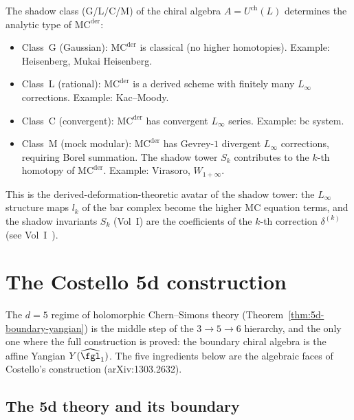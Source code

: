 \begin{remark}
\label{rem:shadow-class-mc}
The shadow class (G/L/C/M) of the chiral algebra $A = U^{\mathrm{ch}}(L)$ determines the analytic type of $\mathrm{MC}^{\mathrm{der}}$:
\begin{itemize}
 \item Class~G (Gaussian): $\mathrm{MC}^{\mathrm{der}}$ is classical (no higher homotopies). Example: Heisenberg, Mukai Heisenberg.
 \item Class~L (rational): $\mathrm{MC}^{\mathrm{der}}$ is a derived scheme with finitely many $L_\infty$ corrections. Example: Kac--Moody.
 \item Class~C (convergent): $\mathrm{MC}^{\mathrm{der}}$ has convergent $L_\infty$ series. Example: bc system.
 \item Class~M (mock modular): $\mathrm{MC}^{\mathrm{der}}$ has Gevrey-$1$ divergent $L_\infty$ corrections, requiring Borel summation. The shadow tower $S_k$ contributes to the $k$-th homotopy of $\mathrm{MC}^{\mathrm{der}}$. Example: Virasoro, $W_{1+\infty}$.
\end{itemize}
This is the derived-deformation-theoretic avatar of the shadow tower: the $L_\infty$ structure maps $l_k$ of the bar complex become the higher MC equation terms, and the shadow invariants $S_k$ (Vol~I) are the coefficients of the $k$-th correction $\delta^{(k)}$ (see Vol~I~\cite{VolI}).
\end{remark}

\section{The Costello 5d construction}
\label{sec:costello-5d-construction}

The $d = 5$ regime of holomorphic Chern--Simons theory
(Theorem~\ref{thm:5d-boundary-yangian}) is the middle step of the
\(3\to5\to6\) hierarchy, and the only one where the full construction is
proved: the boundary chiral algebra is the affine Yangian
\(Y(\widehat{\fgl}_1)\). The five ingredients below are the algebraic
faces of Costello's construction (arXiv:1303.2632).

\subsection{The 5d theory and its boundary}
\label{subsec:5d-theory}

